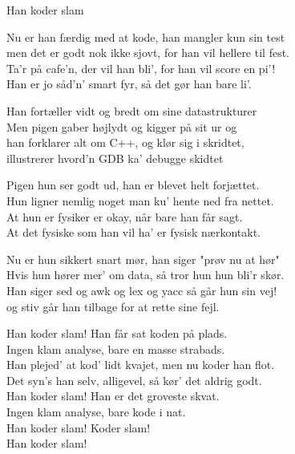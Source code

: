 \begin{song}{Han koder slam}
  \begin{SBVerse}
    Nu er han færdig med at kode, han mangler kun sin test\\
    men det er godt nok ikke sjovt, for han vil hellere til fest.\\
    Ta'r på cafe'n, der vil han bli', for han vil score en pi'!\\
    Han er jo såd'n' smart fyr, så det gør han bare li'.
  \end{SBVerse}

  \begin{SBVerse}
    Han fortæller vidt og bredt om sine datastrukturer\\
    Men pigen gaber højlydt og kigger på sit ur og\\
    han forklarer alt om C++, og klør sig i skridtet,\\
    illustrerer hvord'n GDB ka' debugge skidtet
  \end{SBVerse}

  \begin{SBVerse}
    Pigen hun ser godt ud, han er blevet helt forjættet.\\
    Hun ligner nemlig noget man ku' hente ned fra nettet.\\
    At hun er fysiker er okay, når bare han får sagt.\\
    At det fysiske som han vil ha' er fysisk nærkontakt.
  \end{SBVerse}

  \begin{SBVerse}
    Nu er hun sikkert snart mør, han siger "prøv nu at hør"\\
    Hvis hun hører mer' om data, så tror hun hun bli'r skør.\\
    Han siger sed og awk og lex og yacc så går hun sin vej!\\
    og stiv går han tilbage for at rette sine fejl.
  \end{SBVerse}

  \begin{SBChorus}
    Han koder slam! Han får sat koden på plads.\\
    Ingen klam analyse, bare en masse strabads.\\
    Han plejed' at kod' lidt kvajet, men nu koder han flot.\\
    Det syn's han selv, alligevel, så kør' det aldrig godt.\\
    Han koder slam! Han er det groveste skvat.\\
    Ingen klam analyse, bare kode i nat.\\
    Han koder slam! Koder slam!\\
    Han koder slam!
  \end{SBChorus}
\end{song}